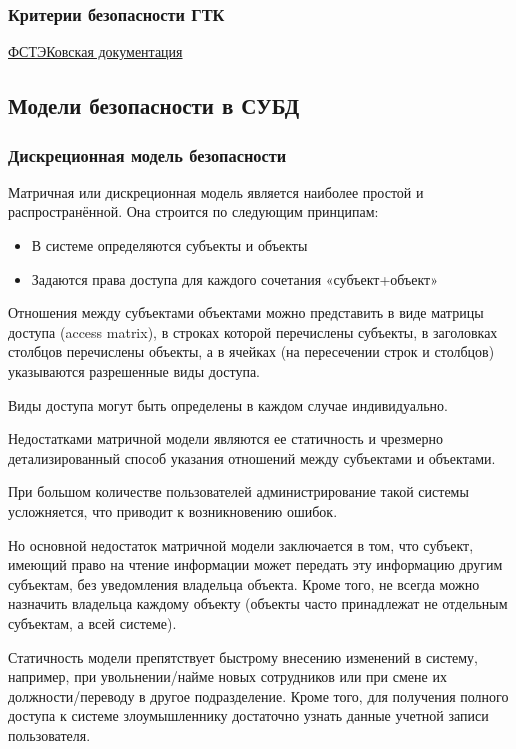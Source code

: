\subsubsection{Критерии безопасности ГТК}
\href{https://fstec.ru/component/attachments/download/293}{ФСТЭКовская документация}



\subsection{Модели безопасности в СУБД}
\subsubsection{Дискреционная модель безопасности}
Матричная или дискреционная модель является наиболее простой и распространённой. Она строится по следующим принципам:
\begin{itemize}
	\item В системе определяются субъекты и объекты
	\item Задаются права доступа для каждого сочетания «субъект+объект»
\end{itemize}
Отношения между субъектами объектами можно представить в виде матрицы доступа (access matrix), в строках которой перечислены субъекты, в заголовках столбцов перечислены объекты, а в ячейках (на пересечении строк и столбцов) указываются разрешенные виды доступа.

Виды доступа могут быть определены в каждом случае индивидуально.

Недостатками матричной модели являются ее статичность и чрезмерно детализированный способ указания отношений между субъектами и объектами.

При большом количестве пользователей администрирование такой системы усложняется, что приводит к возникновению ошибок.

Но основной недостаток матричной модели заключается в том, что субъект, имеющий право на чтение информации может передать эту информацию другим субъектам, без уведомления владельца объекта. Кроме того, не всегда можно назначить владельца каждому объекту (объекты часто принадлежат не отдельным субъектам, а всей системе).

Статичность модели препятствует быстрому внесению изменений в систему, например, при увольнении/найме новых сотрудников или при смене их должности/переводу в другое подразделение.
Кроме того, для получения полного доступа к системе злоумышленнику достаточно узнать данные учетной записи пользователя. 

